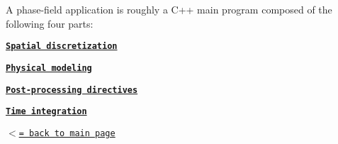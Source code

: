 A phase-\/field application is roughly a C++ main program composed of the following four parts\+:


\begin{DoxyEnumerate}
\item \href{__spatial.html}{\tt {\bfseries Spatial discretization}}
\item \href{__physical.html}{\tt {\bfseries Physical modeling}}
\item \href{__post_processing.html}{\tt {\bfseries Post-\/processing directives}}
\item \href{__time.html}{\tt {\bfseries Time integration}}
\end{DoxyEnumerate}

\href{index.html}{\tt $<$= back to main page} 